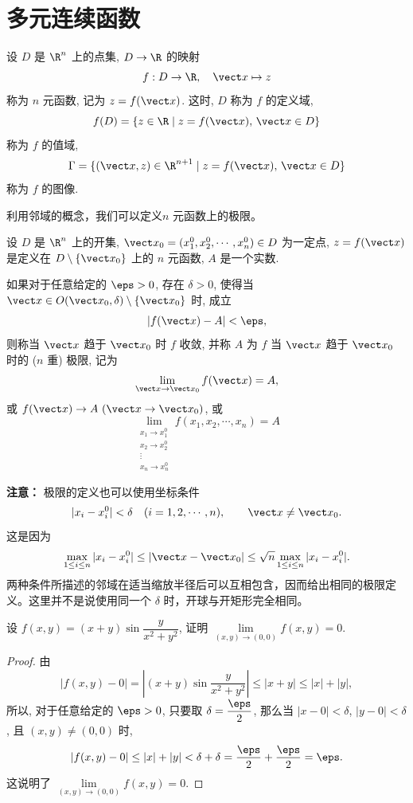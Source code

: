\section{多元连续函数}

\begin{definition}
	设 $D$ 是 $\R^n$ 上的点集, $D \to \R$ 的映射
	\[
	f: D \to \R, \quad \vect x \mapsto z
	\]
	称为 $n$ 元函数, 记为 $z = f(\vect x)$. 这时, $D$ 称为 $f$ 的定义域, $$f(D) = \{ z \in \R \mid z = f(\vect x),\, \vect x \in D \}$$ 称为 $f$ 的值域, $$\Gamma = \{ (\vect x, z) \in \R^{n+1} \mid z = f(\vect x),\, \vect x \in D \}$$ 称为 $f$ 的图像.
\end{definition}
利用邻域的概念，我们可以定义$n$ 元函数上的极限。
\begin{definition}
	设 $D$ 是 $\R^n$ 上的开集, $\vect x_0 = (x_1^0, x_2^0, \cdots, x_n^0) \in D$ 为一定点, $z = f(\vect x)$ 是定义在 $D \setminus \{ \vect x_0 \}$ 上的 $n$ 元函数, $A$ 是一个实数. 
	
	如果对于任意给定的 $\eps > 0$, 存在 $\delta > 0$, 使得当 $\vect x \in O(\vect x_0, \delta) \setminus \{ \vect x_0 \}$ 时, 成立
	\[
	|f(\vect x) - A| < \eps,
	\]
	则称当 $\vect x$ 趋于 $\vect x_0$ 时 $f$ 收敛, 并称 $A$ 为 $f$ 当 $\vect x$ 趋于 $\vect x_0$ 时的 ($n$ 重) 极限, 记为
	\[
	\lim_{\vect x \to \vect x_0} f(\vect x) = A,
	\]
	或 $f(\vect x) \to A\ (\vect x \to \vect x_0)$, 或 $$\lim\limits_{\substack{x_1 \to x_1^0\\ x_2 \to x_2^0\\ \vdots\\ x_n \to x_n^0}} f(x_1, x_2, \cdots, x_n) = A$$
\end{definition}
\textbf{注意：} 极限的定义也可以使用坐标条件
\[
|x_i-x_i^0|<\delta\quad(i=1,2,\cdots,n),\qquad \vect x\neq\vect x_0.
\]
这是因为
\[
\max_{1\leq i\leq n}|x_i-x_i^0|
\leq|\vect x-\vect x_0|
\leq\sqrt n\max_{1\leq i\leq n}|x_i-x_i^0|.
\]
两种条件所描述的邻域在适当缩放半径后可以互相包含，因而给出相同的极限定义。这里并不是说使用同一个 $\delta$ 时，开球与开矩形完全相同。

\begin{example}
	设 $f(x, y) = (x + y) \sin \dfrac{y}{x^2 + y^2}$, 证明 $\lim\limits_{(x, y) \to (0, 0)} f(x, y) = 0$.
\end{example}

\begin{proof}
	由
	\[
	|f(x, y) - 0| = \left| (x + y) \sin \frac{y}{x^2 + y^2} \right| \le |x + y| \le |x| + |y|,
	\]
	所以, 对于任意给定的 $\eps > 0$, 只要取 $\delta = \dfrac{\eps}{2}$, 那么当 $|x - 0| < \delta$, $|y - 0| < \delta$, 且 $(x, y) \neq (0, 0)$ 时,
	\[
	|f(x, y) - 0| \le |x| + |y| < \delta + \delta = \frac{\eps}{2} + \frac{\eps}{2} = \eps.
	\]
	这说明了 $\lim\limits_{(x, y) \to (0, 0)} f(x, y) = 0$.
\end{proof}

